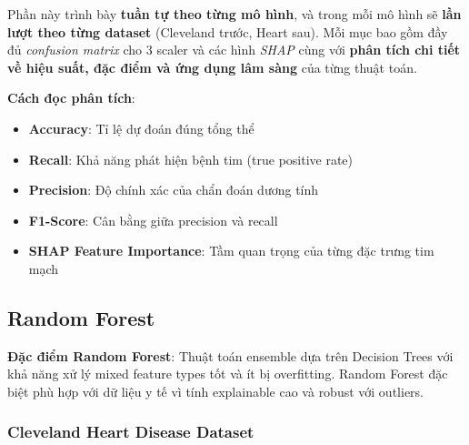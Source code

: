 \noindent
Phần này trình bày \textbf{tuần tự theo từng mô hình}, và trong mỗi mô hình sẽ \textbf{lần lượt theo từng dataset} (Cleveland trước, Heart sau). Mỗi mục bao gồm đầy đủ \textit{confusion matrix} cho 3 scaler và các hình \textit{SHAP} cùng với \textbf{phân tích chi tiết về hiệu suất, đặc điểm và ứng dụng lâm sàng} của từng thuật toán.

\textbf{Cách đọc phân tích}: 
\begin{itemize}[leftmargin=*]
    \item \textbf{Accuracy}: Tỉ lệ dự đoán đúng tổng thể
    \item \textbf{Recall}: Khả năng phát hiện bệnh tim (true positive rate)
    \item \textbf{Precision}: Độ chính xác của chẩn đoán dương tính
    \item \textbf{F1-Score}: Cân bằng giữa precision và recall
    \item \textbf{SHAP Feature Importance}: Tầm quan trọng của từng đặc trưng tim mạch
\end{itemize}

\subsection{Random Forest}\label{subsec:rf}

\textbf{Đặc điểm Random Forest}: Thuật toán ensemble dựa trên Decision Trees với khả năng xử lý mixed feature types tốt và ít bị overfitting. Random Forest đặc biệt phù hợp với dữ liệu y tế vì tính explainable cao và robust với outliers.

\subsubsection{Cleveland Heart Disease Dataset}\label{subsubsec:rf-cleveland}

